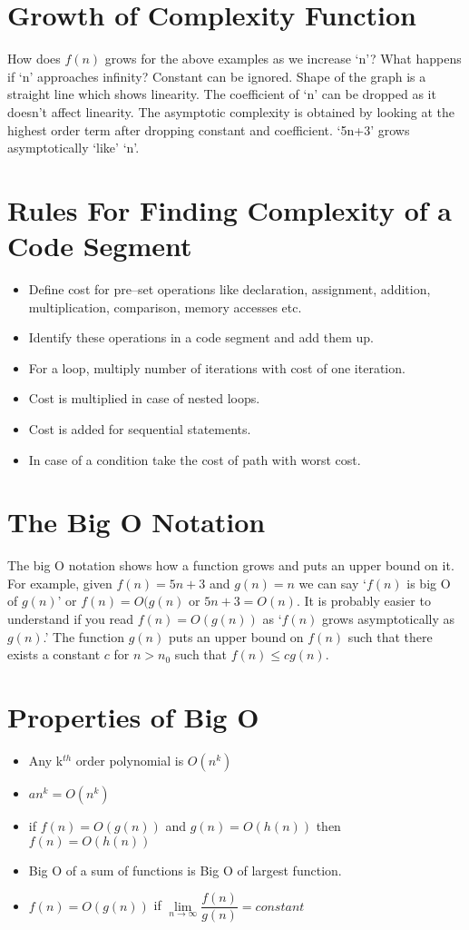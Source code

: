 \documentclass[12pt,a4paper]{article}
\begin{document}
\section{Growth of Complexity Function}
How does $f(n)$ grows for the above examples as we increase `n'? What happens if `n' approaches infinity? Constant can be ignored. Shape of the graph is a straight line which shows linearity. The coefficient of `n' can be dropped as it doesn't affect linearity. The asymptotic complexity is obtained by looking at the highest order term after dropping constant and coefficient. `5n+3' grows asymptotically `like' `n'.
\section{Rules For Finding Complexity of a Code Segment}
\begin{itemize}
\item Define cost for pre--set operations like declaration, assignment, addition, multiplication, comparison, memory accesses etc.
\item Identify these operations in a code segment and add them up.
\item For a loop, multiply number of iterations with cost of one iteration.
\item Cost is multiplied in case of nested loops.
\item Cost is added for sequential statements.
\item In case of a condition take the cost of path with worst cost.
\end{itemize}
\section{The Big O Notation}
The big O notation shows how a function grows and puts an upper bound on it. For example, given $f(n)=5n+3$ and $g(n)=n$ we can say `$f(n)$ is big O of $g(n)$' or $f(n)=O(g(n)$ or $5n+3=O(n)$. It is probably easier to understand if you read $f(n)=O(g(n))$ as `$f(n)$ grows asymptotically as $g(n)$.' The function $g(n)$ puts an upper bound on $f(n)$ such that there exists a constant $c$ for $n>n_0$ such that $f(n)\leq cg(n)$.
\section{Properties of Big O\cite{REF:Complexityutexas}}
\begin{itemize}
\item Any k$^{th}$ order polynomial is $O(n^k)$
\item $an^k=O(n^k)$
\item if $f(n)=O(g(n))$ and $g(n)=O(h(n))$ then $f(n)=O(h(n))$
\item Big O of a sum of functions is Big O of largest function.
\item $f(n)=O(g(n))$ if \(\lim\limits_{n \to \infty}\dfrac{f(n)}{g(n)}=constant\)
\end{itemize}
\end{document}
